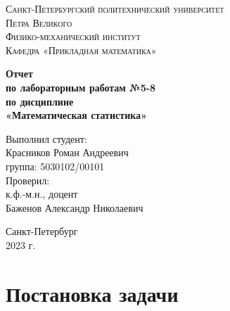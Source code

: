 \documentclass[12pt]{article}
\begin{document}
	\begin{titlepage}
		\begin{center}
			\textsc{Санкт-Петербургский политехнический университет\\Петра Великого\\[5mm]
				Физико-механический институт\\[2mm]
				Кафедра «Прикладная математика»}
			
			\vfill
			
			\textbf{Отчет\\по лабораторным работам №5-8\\по дисциплине\\«Математическая статистика»
				\\[26mm]
			}
		\end{center}
		
		\noindent
		\hspace*{100mm} Выполнил студент:\\[3mm]
		\hspace*{100mm} Красников Роман Андреевич\\
		\hspace*{100mm} группа: 5030102/00101\\[10mm]
		\hspace*{100mm} Проверил:\\[3mm]
		\hspace*{100mm} к.ф.-м.н., доцент\\
		\hspace*{100mm} Баженов Александр Николаевич
		
		\vspace*{\fill}
		\begin{center}
			Санкт-Петербург\\2023 г.
		\end{center}
	\end{titlepage}
	
	\newpage
	\tableofcontents
	\newpage
	\listoffigures
	\newpage
	\listoftables
	\newpage
	
	\section{Постановка задачи}
	
\end{document}
